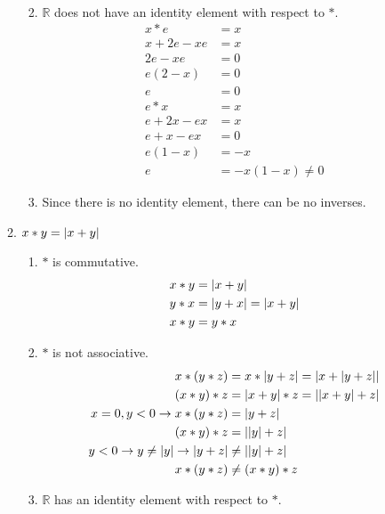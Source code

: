 \begin{enumerate}[label={\Alph*.},font={\bfseries}]
\begin{enumerate}[label={\arabic*},font={\bfseries}]
\begin{enumerate}[label={(\roman*)}]
\begin{align*}
            \end{align*}
          \item $\mathbb{R}$ does not have an identity element with respect to $*$.
            \begin{align*}
              x*e &= x \\
              x+2e-xe &= x \\
              2e-xe &= 0 \\
              e(2-x) &= 0 \\
              e &=0 \\
              e*x &= x \\
              e+2x-ex &= x \\
              e+x-ex &= 0 \\
              e(1-x) &= -x \\
              e &= -x(1-x) \neq 0
            \end{align*}
          \item Since there is no identity element, there can be no inverses.
        \end{enumerate}
      \item $x*y=\lvert x+y\rvert$
        \begin{enumerate}[label={(\roman*)}]
          \item $*$ is commutative.
            \begin{align*}
              x*y &= \lvert x+y\rvert \\
              y*x &= \lvert y+x\rvert = \lvert x+y\rvert \\
              x*y &= y*x
            \end{align*}
          \item $*$ is not associative.
            \begin{align*}
              x*(y*z) &= x*\lvert y+z\rvert = \lvert x+\lvert y+z\rvert\rvert \\
              (x*y)*z &= \lvert x+y\rvert*z = \lvert\lvert x+y\rvert+z\rvert \\
              x=0,y<0 \to x*(y*z) &= \lvert y+z\rvert \\
              (x*y)*z &= \lvert\lvert y\rvert+z\rvert \\
              y<0 \to y \neq \lvert y\rvert \to \lvert y+z\rvert &\neq \lvert\lvert y\rvert+z\rvert\\
              x*(y*z) &\neq (x*y)*z
            \end{align*}
          \item $\mathbb{R}$ has an identity element with respect to $*$.
            \begin{align*}

\end{align*}
\end{enumerate}
\end{enumerate}
\end{enumerate}
